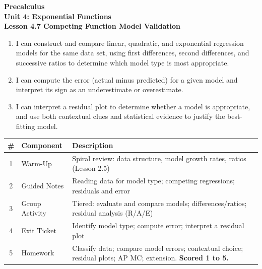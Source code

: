 \documentclass[10pt]{article}
\begin{document}
\vspace{-0.8in}

\begin{center}
  {\color{white}\textbf{\LARGE Precalculus}}\\[4pt]
  {\color{skymid}\large\textbf{Unit 4: Exponential Functions}}\\[6pt]
  {\color{white}\textbf{\large Lesson 4.7 \quad Competing Function Model Validation}}
\end{center}

\vspace{0.22in}
\namedateperiod
\vspace{0.18in}

\begin{learningtargetbox}
\small
\begin{enumerate}[leftmargin=1.5em, itemsep=5pt]
  \item I can construct and compare linear, quadratic, and exponential regression models for the
        same data set, using first differences, second differences, and successive ratios to
        determine which model type is most appropriate.
  \item I can compute the error (actual minus predicted) for a given model and interpret its sign
        as an underestimate or overestimate.
  \item I can interpret a residual plot to determine whether a model is appropriate, and use both
        contextual clues and statistical evidence to justify the best-fitting model.
\end{enumerate}
\end{learningtargetbox}

\vspace{0.14in}

\begin{tocbox}
\small
\renewcommand{\arraystretch}{1.5}
\begin{tabularx}{\linewidth}{@{} c l X @{}}
\rowcolor{sky}
\textbf{\#} & \textbf{Component} & \textbf{Description} \\
\midrule
1 & Warm-Up        & Spiral review: data structure, model growth rates, ratios (Lesson 2.5) \\
2 & Guided Notes   & Reading data for model type; competing regressions; residuals and error \\
3 & Group Activity & Tiered: evaluate and compare models; differences/ratios; residual analysis (R/A/E) \\
4 & Exit Ticket    & Identify model type; compute error; interpret a residual plot \\
5 & Homework       & Classify data; compare model errors; contextual choice; residual plots; AP MC; extension. \textbf{Scored 1 to 5.} \\
\end{tabularx}
\end{tocbox}
\end{document}
